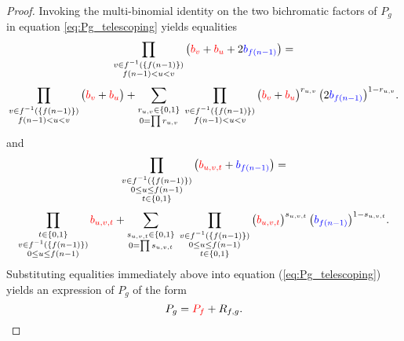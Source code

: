 \begin{proof}
Invoking the {multi-binomial} identity on the two
bichromatic factors of $P_{g}$ in equation \eqref{eq:Pg_telescoping} yields equalities
\[
\prod_{\substack{v \in f^{-1}\left(\{f(n-1)\}\right) \\ f(n-1) < u < v}} \left(\textcolor{red}{b_v} + \textcolor{red}{b_u} + 2 \textcolor{blue}{b_{f(n-1)}}\right) =
\]
\[
\prod_{\substack{v \in f^{-1}\left(\{f(n-1)\}\right) \\ f(n-1) < u < v}} \big(\textcolor{red}{b_v} + \textcolor{red}{b_u}\big) 
+ \sum_{\substack{r_{u,v} \in \{0,1\} \\ 0 = \prod r_{u,v}}} \;
\prod_{\substack{v \in f^{-1}\left(\{f(n-1)\}\right) \\ f(n-1) < u < v}} \big(\textcolor{red}{b_v} + \textcolor{red}{b_u}\big)^{r_{u,v}} \, \big(2 \textcolor{blue}{b_{f(n-1)}}\big)^{1-r_{u,v}}.
\]
and
\[
\prod_{\substack{v \in f^{-1}\left(\{f(n-1)\}\right) \\ 0 \leq u \leq f(n-1) \\ t \in \{0,1\}}} \left(\textcolor{red}{b_{u,v,t}} + \textcolor{blue}{b_{f(n-1)}}\right) =
\]
\[
\prod_{\substack{t \in \{0,1\} \\ v \in f^{-1}\left(\{f(n-1)\}\right) \\ 0 \leq u \leq f(n-1)}} \textcolor{red}{b_{u,v,t}}
+ \sum_{\substack{s_{u,v,t} \in \{0,1\} \\ 0 = \prod s_{u,v,t}}} \; 
\prod_{\substack{v \in f^{-1}\left(\{f(n-1)\}\right) \\ 0 \leq u \leq f(n-1) \\ t \in \{0,1\}}} \big(\textcolor{red}{b_{u,v,t}}\big)^{s_{u,v,t}} \, \big(\textcolor{blue}{b_{f(n-1)}}\big)^{1-s_{u,v,t}}.
\]
Substituting equalities immediately above into equation (\ref{eq:Pg_telescoping})
yields an expression of $P_{g}$ of the form
\begin{equation}\label{eq:Pg-equals-Pf-plus-Rfg}
    P_{g}={\color{red}P_{f}}+R_{f,g}.
\end{equation}


\end{proof}
